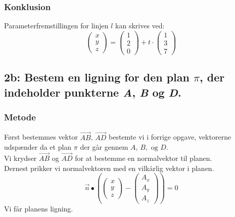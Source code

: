 \documentclass[../main.tex]{subfiles}
\begin{document}
    \subsubsection*{Konklusion}
        Parameterfremstillingen for linjen \(l\) kan skrives ved:
        \[\begin{pmatrix} x \\ y\\ z\end{pmatrix}=\begin{pmatrix}1\\ 2\\0 \end{pmatrix}+ t \cdot \begin{pmatrix} 1 \\ 3\\ 7\end{pmatrix}\]
\clearpage
\subsection*{2b: Bestem en ligning for den plan \(\pi\), der indeholder punkterne \textit{A}, \textit{B} og \textit{D}.}
    \subsubsection*{Metode}
        Først bestemmes vektor \(\overrightarrow{AB}\), \(\overrightarrow{AD}\) bestemte vi i forrige opgave, vektorerne udspænder da et plan \(\pi\) der går gennem \(A,\, B,\text{ og } D\).\\
        Vi krydser \(\overrightarrow{AB}\) og \(\overrightarrow{AD}\) for at bestemme en normalvektor til planen.\\
        Dernest prikker vi normalvektoren med en vilkårlig vektor i planen.
        \[\overrightarrow{n}\bullet \left(\begin{pmatrix} x \\ y \\ z \end{pmatrix}-\begin{pmatrix}A_x \\A_y\\A_z \end{pmatrix}\right)=0\]
        Vi får planens ligning.
\end{document}
